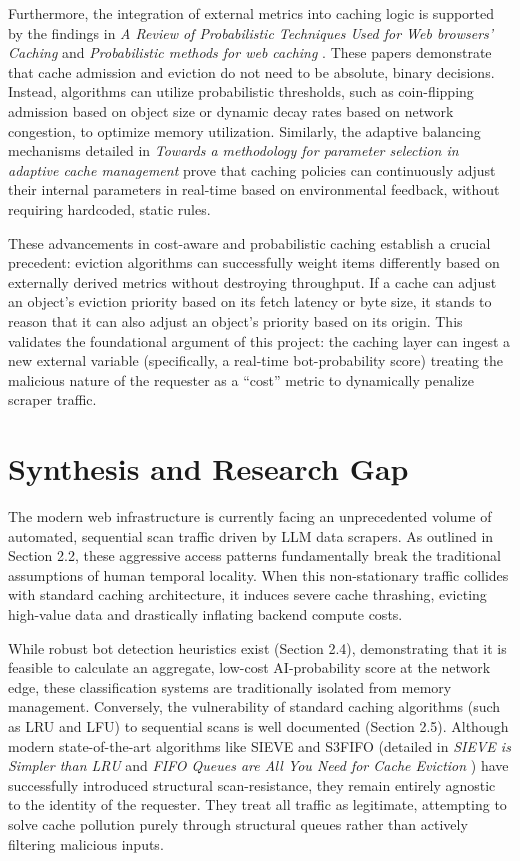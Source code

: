 Furthermore, the integration of external metrics into caching logic is supported by the findings in \textit{A Review of Probabilistic Techniques Used for Web browsers' Caching} \cite{kakar_review_2020} and \textit{Probabilistic methods for web caching} \cite{starobinski_probabilistic_2001}. These papers demonstrate that cache admission and eviction do not need to be absolute, binary decisions. Instead, algorithms can utilize probabilistic thresholds, such as coin-flipping admission based on object size or dynamic decay rates based on network congestion, to optimize memory utilization. Similarly, the adaptive balancing mechanisms detailed in \textit{Towards a methodology for parameter selection in adaptive cache management} \cite{vysotska_towards_2025} prove that caching policies can continuously adjust their internal parameters in real-time based on environmental feedback, without requiring hardcoded, static rules.

These advancements in cost-aware and probabilistic caching establish a crucial precedent: eviction algorithms can successfully weight items differently based on externally derived metrics without destroying throughput. If a cache can adjust an object's eviction priority based on its fetch latency or byte size, it stands to reason that it can also adjust an object's priority based on its origin. This validates the foundational argument of this project: the caching layer can ingest a new external variable (specifically, a real-time bot-probability score) treating the malicious nature of the requester as a ``cost'' metric to dynamically penalize scraper traffic.

\section{Synthesis and Research Gap}
The modern web infrastructure is currently facing an unprecedented volume of automated, sequential scan traffic driven by LLM data scrapers. As outlined in Section 2.2, these aggressive access patterns fundamentally break the traditional assumptions of human temporal locality. When this non-stationary traffic collides with standard caching architecture, it induces severe cache thrashing, evicting high-value data and drastically inflating backend compute costs.

While robust bot detection heuristics exist (Section 2.4), demonstrating that it is feasible to calculate an aggregate, low-cost AI-probability score at the network edge, these classification systems are traditionally isolated from memory management. Conversely, the vulnerability of standard caching algorithms (such as LRU and LFU) to sequential scans is well documented (Section 2.5). Although modern state-of-the-art algorithms like SIEVE and S3FIFO (detailed in \textit{SIEVE is Simpler than LRU} \cite{zhang_sieve_2024} and \textit{FIFO Queues are All You Need for Cache Eviction} \cite{yang_fifo_2023}) have successfully introduced structural scan-resistance, they remain entirely agnostic to the identity of the requester. They treat all traffic as legitimate, attempting to solve cache pollution purely through structural queues rather than actively filtering malicious inputs.

